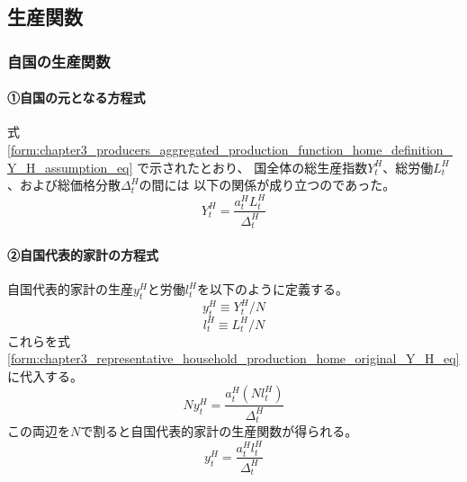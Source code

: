 
\subsection{生産関数}
\label{sec:chapter3_representative_household_production}

\subsubsection{自国の生産関数}
\label{sec:chapter3_representative_household_production_home}

\paragraph{①自国の元となる方程式}
\label{sec:chapter3_representative_household_production_home_original}
式
\eqref{form:chapter3_producers_aggregated_production_function_home_definition_Y_H_assumption_eq}
で示されたとおり、
国全体の総生産指数\(Y_t^H\)、総労働\(L_t^H\)、および総価格分散\(\Delta_t^H\)の間には
以下の関係が成り立つのであった。
\begin{equation}
\label{form:chapter3_representative_household_production_home_original_Y_H_eq}
    Y_t^H=\frac{a_t^HL_t^H}{\Delta_t^H}
\end{equation}

\paragraph{②自国代表的家計の方程式}
\label{sec:chapter3_representative_household_production_home_representative}
自国代表的家計の生産\(y_t^H\)と労働\(l_t^H\)を以下のように定義する。
\begin{equation}
\label{form:chapter3_representative_household_production_home_representative_y_H_def}
    y_t^H\equiv Y_t^H/N
\end{equation}
\begin{equation}
\label{form:chapter3_representative_household_production_home_representative_l_H_def}
    l_t^H\equiv L_t^H/N
\end{equation}
これらを式
\eqref{form:chapter3_representative_household_production_home_original_Y_H_eq}
に代入する。
\begin{equation}
\label{form:chapter3_representative_household_production_home_original_y_H_eq}
    Ny_t^H=\frac{a_t^H(Nl_t^H)}{\Delta_t^H}
\end{equation}
この両辺を\(N\)で割ると自国代表的家計の生産関数が得られる。
\begin{equation}
\label{form:chapter3_representative_household_production_home_original_y_H_modified_eq}
    y_t^H=\frac{a_t^Hl_t^H}{\Delta_t^H}
\end{equation}

